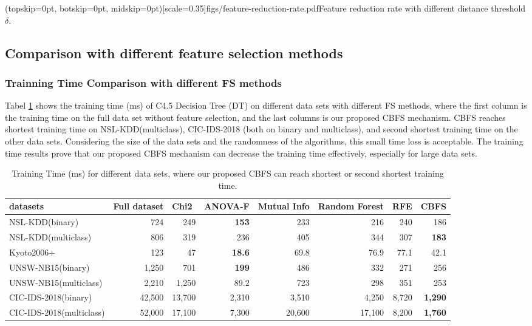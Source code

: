 \documentclass{ieeeaccess}
\theoremstyle{definition}
\begin{document}
\Figure[!htpb](topskip=0pt, botskip=0pt, midskip=0pt)[scale=0.35]{figs/feature-reduction-rate.pdf}{Feature reduction rate with different distance threshold $\delta$. \label{fig:feature-reduction-rate}}

\subsection{Comparison with different feature selection methods}

\subsubsection{Trainning Time Comparison with different FS methods}

Tabel \ref{tab:training-time} shows the training time (ms) of C4.5 Decision Tree (DT) \cite{quinlan2014c4} on different data sets with different FS methods, where the first column is the training time on the full data set without feature selection, and the last columns is our proposed CBFS mechanism. CBFS reaches shortest training time on NSL-KDD(multiclass), CIC-IDS-2018 (both on binary and multiclass), and second shortest training time on the other data sets. Considering the size of the data sets and the randomness of the algorithms, this small time loss is acceptable. The training time results prove that our proposed CBFS mechanism can decrease the training time effectively, especially for large data sets.

\begin{table}[htbp]
    \centering
    \caption{Training Time (ms) for different data sets, where our proposed CBFS can reach shortest or second shortest training time.}
    \begin{tabular}{lrrrrrrr}
        \toprule
        datasets & \multicolumn{1}{l}{Full dataset} & \multicolumn{1}{l}{Chi2} & \multicolumn{1}{l}{ANOVA-F} & \multicolumn{1}{l}{Mutual Info} & \multicolumn{1}{l}{Random Forest} & \multicolumn{1}{l}{RFE} & \multicolumn{1}{l}{CBFS} \\
        \midrule
        NSL-KDD(binary) & 724   & 249   & \textbf{153} & 233   & 216   & 240   & 186 \\
        NSL-KDD(multiclass) & 806   & 319   & 236   & 405   & 344   & 307   & \textbf{183} \\
        Kyoto2006+ & 123   & 47    & \textbf{18.6} & 69.8  & 76.9  & 77.1  & 42.1 \\
        UNSW-NB15(binary) & 1,250  & 701   & \textbf{199} & 486   & 332   & 271   & 256 \\
        UNSW-NB15(multiclass) & 2,210  & 1,250  & 89.2  & 723   & 298   & 351   & 253 \\
        CIC-IDS-2018(binary) & 42,500 & 13,700 & 2,310  & 3,510  & 4,250  & 8,720  & \textbf{1,290} \\
        CIC-IDS-2018(multiclass) & 52,000 & 17,100 & 7,300  & 20,600 & 17,100 & 8,200  & \textbf{1,760} \\
        \bottomrule
        \end{tabular}%
    \label{tab:training-time}%
\end{table}%
\end{document}
